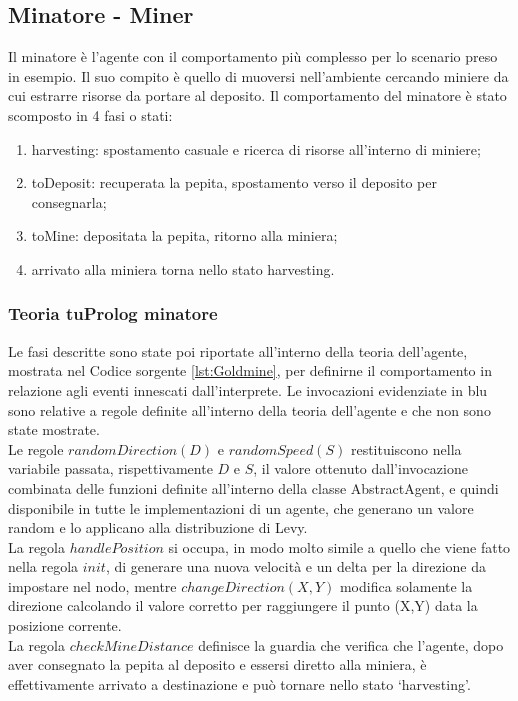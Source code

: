 \subsection{Minatore - Miner}
Il minatore è l'agente con il comportamento più complesso per lo scenario preso in esempio.
Il suo compito è quello di muoversi nell'ambiente cercando miniere da cui estrarre risorse da portare al deposito.
Il comportamento del minatore è stato scomposto in 4 fasi o stati:
\begin{enumerate}
\item harvesting: spostamento casuale e ricerca di risorse all'interno di miniere;
\item toDeposit: recuperata la pepita, spostamento verso il deposito per consegnarla;
\item toMine: depositata la pepita, ritorno alla miniera;
\item arrivato alla miniera torna nello stato harvesting.
\end{enumerate}

\subsubsection{Teoria tuProlog minatore}
Le fasi descritte sono state poi riportate all'interno della teoria dell'agente, mostrata nel Codice sorgente \ref{lst:Goldmine}, per definirne il comportamento in relazione agli eventi innescati dall'interprete. Le invocazioni evidenziate in blu sono relative a regole definite all'interno della teoria dell'agente e che non sono state mostrate.
\\
Le regole $ randomDirection(D)$ e $randomSpeed(S)$ restituiscono nella variabile passata, rispettivamente $D$ e $S$, il valore ottenuto dall'invocazione combinata delle funzioni definite all'interno della classe AbstractAgent, e quindi disponibile in tutte le implementazioni di un agente, che generano un valore random e lo applicano alla distribuzione di Levy.
\\
La regola $handlePosition$ si occupa, in modo molto simile a quello che viene fatto nella regola $init$, di generare una nuova velocità e un delta per la direzione da impostare nel nodo, mentre $changeDirection(X,Y)$ modifica solamente la direzione calcolando il valore corretto per raggiungere il punto (X,Y) data la posizione corrente.
\\
La regola $checkMineDistance$ definisce la guardia che verifica che l'agente, dopo aver consegnato la pepita al deposito e essersi diretto alla miniera, è effettivamente arrivato a destinazione e può tornare nello stato `harvesting'.

